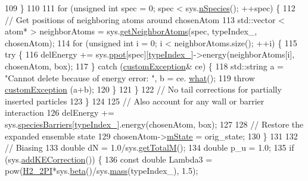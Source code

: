 \begin{DoxyCode}
109         \}
110 
111         \textcolor{keywordflow}{for} (\textcolor{keywordtype}{unsigned} \textcolor{keywordtype}{int} spec = 0; spec < sys.\hyperlink{classsim_system_ab5e2e9b6204de15520302fe1d51688dd}{nSpecies}(); ++spec) \{
112             \textcolor{comment}{// Get positions of neighboring atoms around chosenAtom}
113             std::vector < atom* > neighborAtoms = sys.\hyperlink{classsim_system_a9b3aeefa22c3b50b5913df6eea753bc6}{getNeighborAtoms}(spec, typeIndex\_, 
      chosenAtom);
114             \textcolor{keywordflow}{for} (\textcolor{keywordtype}{unsigned} \textcolor{keywordtype}{int} i = 0; i < neighborAtoms.size(); ++i) \{
115                 \textcolor{keywordflow}{try} \{
116                     delEnergy += sys.\hyperlink{classsim_system_ad2e290b5963f132e6a3a56cee35c8e9f}{ppot}[spec][\hyperlink{classmc_move_acb731965547b0326ef318ec96da8b46a}{typeIndex\_}]->energy(neighborAtoms[i], 
      chosenAtom, box);
117                 \} \textcolor{keywordflow}{catch} (\hyperlink{classcustom_exception}{customException}& ce) \{
118                     std::string a = \textcolor{stringliteral}{"Cannot delete because of energy error: "}, b = ce.
      \hyperlink{classcustom_exception_aeb6ab5848b038adfc68fde86a512f691}{what}();
119                     \textcolor{keywordflow}{throw} \hyperlink{classcustom_exception}{customException} (a+b);
120                 \}
121             \}
122             \textcolor{comment}{// No tail corrections for partially inserted particles}
123         \}
124 
125         \textcolor{comment}{// Also account for any wall or barrier interaction}
126         delEnergy += sys.\hyperlink{classsim_system_a5ae652ff4519f39c3862abae32a9581b}{speciesBarriers}[\hyperlink{classmc_move_acb731965547b0326ef318ec96da8b46a}{typeIndex\_}].energy(chosenAtom, box);
127 
128         \textcolor{comment}{// Restore the expanded ensemble state}
129         chosenAtom->\hyperlink{classatom_a3cb00c0c5b7533657e05af6ff4a42740}{mState} = orig\_state;
130     \}
131 
132     \textcolor{comment}{// Biasing}
133     \textcolor{keywordtype}{double} dN = 1.0/sys.\hyperlink{classsim_system_aa4ad1afff101bb530e1590df05035276}{getTotalM}();
134     \textcolor{keywordtype}{double} p\_u = 1.0;
135     \textcolor{keywordflow}{if} (sys.\hyperlink{classsim_system_a09c4ea670168c9f1d549d2a5120eb13c}{addKECorrection}()) \{
136         \textcolor{keyword}{const} \textcolor{keywordtype}{double} Lambda3 = pow(\hyperlink{global_8h_af42f520b793f7c9dff15cba3bad0eb58}{H2\_2PI}*sys.\hyperlink{classsim_system_a3eeec9678902f8d7fce4dad6064aaf4c}{beta}()/sys.\hyperlink{classsim_system_a7c75052458072e1267bc20594b58d8cd}{mass}(typeIndex\_), 1.5);

\end{DoxyCode}
